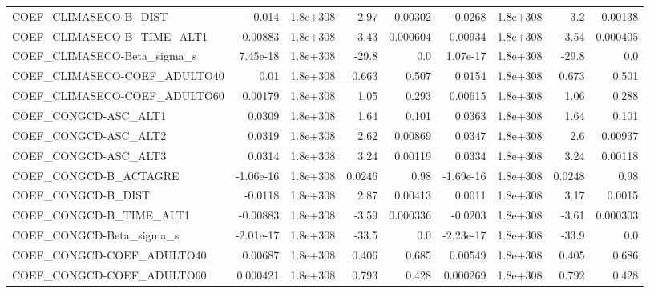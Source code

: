 \begin{tabular}{lrrrrrrrr}
COEF\_CLIMASECO-B\_DIST             &      -0.014 &     1.8e+308 &      2.97 &  0.00302 &    -0.0268 &    1.8e+308 &          3.2 &       0.00138 \\
COEF\_CLIMASECO-B\_TIME\_ALT1        &    -0.00883 &     1.8e+308 &     -3.43 & 0.000604 &    0.00934 &    1.8e+308 &        -3.54 &      0.000405 \\
COEF\_CLIMASECO-Beta\_sigma\_s       &    7.45e-18 &     1.8e+308 &     -29.8 &      0.0 &   1.07e-17 &    1.8e+308 &        -29.8 &           0.0 \\
COEF\_CLIMASECO-COEF\_ADULTO40      &        0.01 &     1.8e+308 &     0.663 &    0.507 &     0.0154 &    1.8e+308 &        0.673 &         0.501 \\
COEF\_CLIMASECO-COEF\_ADULTO60      &     0.00179 &     1.8e+308 &      1.05 &    0.293 &    0.00615 &    1.8e+308 &         1.06 &         0.288 \\
COEF\_CONGCD-ASC\_ALT1              &      0.0309 &     1.8e+308 &      1.64 &    0.101 &     0.0363 &    1.8e+308 &         1.64 &         0.101 \\
COEF\_CONGCD-ASC\_ALT2              &      0.0319 &     1.8e+308 &      2.62 &  0.00869 &     0.0347 &    1.8e+308 &          2.6 &       0.00937 \\
COEF\_CONGCD-ASC\_ALT3              &      0.0314 &     1.8e+308 &      3.24 &  0.00119 &     0.0334 &    1.8e+308 &         3.24 &       0.00118 \\
COEF\_CONGCD-B\_ACTAGRE             &   -1.06e-16 &     1.8e+308 &    0.0246 &     0.98 &  -1.69e-16 &    1.8e+308 &       0.0248 &          0.98 \\
COEF\_CONGCD-B\_DIST                &     -0.0118 &     1.8e+308 &      2.87 &  0.00413 &     0.0011 &    1.8e+308 &         3.17 &        0.0015 \\
COEF\_CONGCD-B\_TIME\_ALT1           &    -0.00883 &     1.8e+308 &     -3.59 & 0.000336 &    -0.0203 &    1.8e+308 &        -3.61 &      0.000303 \\
COEF\_CONGCD-Beta\_sigma\_s          &   -2.01e-17 &     1.8e+308 &     -33.5 &      0.0 &  -2.23e-17 &    1.8e+308 &        -33.9 &           0.0 \\
COEF\_CONGCD-COEF\_ADULTO40         &     0.00687 &     1.8e+308 &     0.406 &    0.685 &    0.00549 &    1.8e+308 &        0.405 &         0.686 \\
COEF\_CONGCD-COEF\_ADULTO60         &    0.000421 &     1.8e+308 &     0.793 &    0.428 &   0.000269 &    1.8e+308 &        0.792 &         0.428 \\

\end{tabular}
